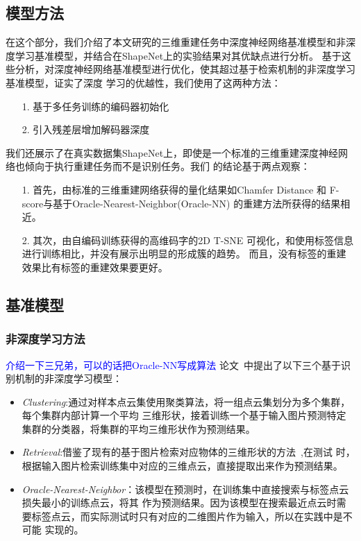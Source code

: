 \documentclass[bachelor, nocolorlinks, printoneside]{seuthesis} %
\newcommand\TODO[1]{\textcolor{blue}{#1}}
\begin{document}
\begin{Main}
\chapter{模型方法}
在这个部分，我们介绍了本文研究的三维重建任务中深度神经网络基准模型和非深度学习基准模型，并结合在ShapeNet上的实验结果对其优缺点进行分析。
基于这些分析，对深度神经网络基准模型进行优化，使其超过基于检索机制的非深度学习基准模型，证实了深度
学习的优越性，我们使用了这两种方法：
\begin{itemize}[\hspace{1cm}]
    \item[1.] 基于多任务训练的编码器初始化
    \item[2.] 引入残差层增加解码器深度
\end{itemize}
我们还展示了在真实数据集ShapeNet上，即使是一个标准的三维重建深度神经网络也倾向于执行重建任务而不是识别任务。我们
的结论基于两点观察：
\begin{itemize}[\hspace{1cm}]
    \item[1.] 首先，由标准的三维重建网络获得的量化结果如Chamfer Distance 和 F-score与基于Oracle-Nearest-Neighbor(Oracle-NN)
    的重建方法所获得的结果相近。
    \item[2.] 其次，由自编码训练获得的高维码字的2D T-SNE 可视化，和使用标签信息进行训练相比，并没有展示出明显的形成簇的趋势。
    而且，没有标签的重建效果比有标签的重建效果要更好。
\end{itemize}

\section{基准模型}
\subsection{非深度学习方法}
\TODO{介绍一下三兄弟，可以的话把Oracle-NN写成算法}
论文~\cite{tatarchenko2019single}中提出了以下三个基于识别机制的非深度学习模型：
\begin{itemize}
    \item \textit{Clustering}:通过对样本点云集使用聚类算法，将一组点云集划分为多个集群，每个集群内部计算一个平均
    三维形状，接着训练一个基于输入图片预测特定集群的分类器，将集群的平均三维形状作为预测结果。
    \item \textit{Retrieval}:借鉴了现有的基于图片检索对应物体的三维形状的方法~\cite{10.1145/2816795.2818071},在测试
    时，根据输入图片检索训练集中对应的三维点云，直接提取出来作为预测结果。
    \item \textit{Oracle-Nearest-Neighbor}：该模型在预测时，在训练集中直接搜索与标签点云损失最小的训练点云，将其
    作为预测结果。因为该模型在搜索最近点云时需要标签点云，而实际测试时只有对应的二维图片作为输入，所以在实践中是不可能
    实现的。
\end{itemize}


\end{Main}
\end{document}
